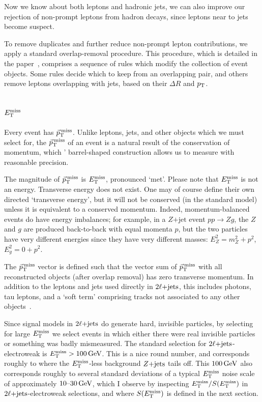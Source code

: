 Now we know about both leptons and hadronic jets, we can also improve our
rejection of non-prompt leptons from hadron decays, since leptons near to jets
become suspect.

To remove duplicates and further reduce non-prompt lepton contributions, we
apply a standard overlap-removal procedure.
This procedure, which is detailed in the paper~\cite{atlas2022searches},
comprises a sequence of rules which modify the collection of event objects.
Some rules decide which to keep from an overlapping pair,
and others remove leptons overlapping with jets, based on their $\Delta R$
and $\pt$.


\subsection{\texorpdfstring{$\met$}{ETmiss}}
Every event has $\ptmiss$.
Unlike leptons, jets, and other objects which we must select for, the $\ptmiss$
of an event is a natural result of the conservation of momentum, which \atlas'
barrel-shaped construction allows us to measure with reasonable precision.

The magnitude of $\ptmiss$ is $\met$, pronounced `met'.
Please note that $\met$ is not an energy.
Transverse energy does not exist.
One may of course define their own directed `transverse energy', but it will
not be conserved (in the standard model) unless it is equivalent to a conserved
momentum.
Indeed, momentum-balanced events do have energy imbalances;
for example, in a $Z\mathrm{+jet}$ event $pp \rightarrow Zg$, the $Z$ and $g$
are produced back-to-back with equal momenta $p$, but the two particles have
very different energies since they have very different masses:
$E_Z^2 = m_Z^2 + p^2$, $E_g^2 = 0 + p^2$.

The $\ptmiss$ vector is defined such that the vector sum of $\ptmiss$ with
all reconstructed objects (after overlap removal) has zero transverse momentum.
In addition to the leptons and jets used directly in $\twoljets$, this includes
photons, tau leptons, and a `soft term' comprising tracks not associated to
any other objects~\cite{atlas_met}.


Since signal models in $\twoljets$ do generate hard, invisible particles,
by selecting for large $\met$ we select events in which either there were real
invisible particles or something was badly mismeasured.
The standard selection for $\twoljets$-electroweak is $\met > 100\,\eV[G]$.
This is a nice round number, and corresponds roughly to where the $\met$-less
background $\zjets$ tails off.
This $100\,\eV[G]$ also corresponds roughly to several standard deviations of
a typical $\met$ noise scale of approximately $10\textrm{--}30\,\eV[G]$, which I observe
by inspecting $\met / \metsig$ in $\twoljets$-electroweak selections,
and where $\metsig$ is defined in the next section.


